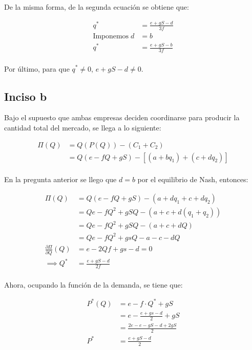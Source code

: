 \documentclass[
	spanish, %
	letterpaper, oneside
]{article}
\begin{document}
De la misma forma, de la segunda ecuación se obtiene que:

	\begin{align*}
		  q^* &= \frac{e + gS - d}{3f}\\
		  \text{Imponemos}\; d &= b\\
		  q^* &= \frac{e + gS - b}{3f}
	\end{align*}\\

Por último, para que $q^*\neq 0$, $e + gS - d\neq 0$.

\subsection{Inciso b}

	Bajo el supuesto que ambas empresas deciden coordinarse para producir la cantidad total del mercado, se llega a lo siguiente:

	\begin{align*}
		  \Pi (Q) &= Q(P(Q))-(C_1 + C_2)\\
		  		&= Q(e-fQ + gS)-\left[ (a+bq_1) + (c + dq_2) \right]
	\end{align*}\\

En la pregunta anterior se llego que $d=b$ por el equilibrio de Nash, entonces:

	\begin{align*}
		  \Pi(Q)&= Q(e - fQ + gS) - (a + dq_1 + c + dq_2)\\
		  		&= Qe - fQ^2 + gSQ - (a + c + d(q_1 + q_2))\\
		  		&= Qe - fQ^2 + gSQ - (a + c + dQ)\\
		  		&= Qe - fQ^2 + gsQ - a - c - dQ\\
		  \frac{\partial\Pi}{\partial Q}(Q) &= e - 2Qf + gs - d = 0\\
		  \implies Q^* &= \frac{e + gS - d}{2f}
		  \end{align*} \\

Ahora, ocupando la función de la demanda, se tiene que:

	\begin{align*}
		P^* (Q) &= e - f\cdot Q^* + gS\\
				&= e - \frac{e + gs - d}{2} + gS\\
				&= \frac{2e-e-gS-d+2gS}{2}\\
		P^*		&= \frac{e + gS - d}{2}
	\end{align*}
\end{document}

